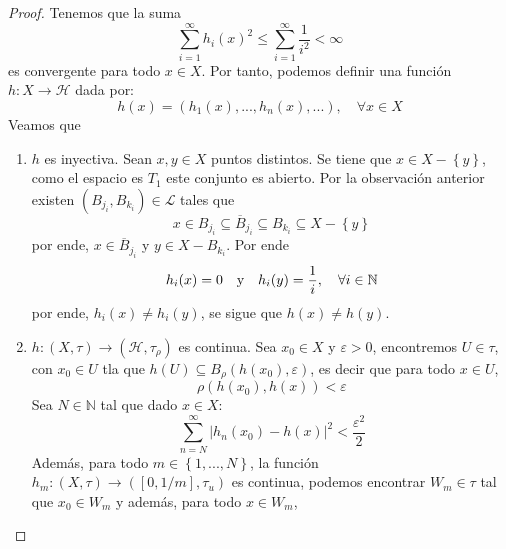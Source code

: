 \documentclass[12pt]{report}
\theoremstyle{largebreak}
\newcommand\abs[1]{\ensuremath{\left|#1\right|}}
\newcommand\cf[3]{\ensuremath{#1:#2\rightarrow#3}}
\begin{document}
    \begin{proof}
        Tenemos que la suma
        \begin{equation*}
            \sum_{ i=1}^\infty h_i(x)^2\leq\sum_{ i=1}^\infty\frac{1}{i^2} <\infty
        \end{equation*}
        es convergente para todo $x\in X$. Por tanto, podemos definir una función $\cf{h}{X}{\mathcal{H}}$ dada por:
        \begin{equation*}
            h(x)=(h_1(x),...,h_n(x),...),\quad\forall x\in X
        \end{equation*}
        Veamos que
        \begin{enumerate}
            \item $h$ es inyectiva. Sean $x,y\in X$ puntos distintos. Se tiene que $x\in X-\left\{y\right\}$, como el espacio es $T_1$ este conjunto es abierto. Por la observación anterior existen $(B_{ j_i},B_{ k_i})\in\mathcal{L}$ tales que
            \begin{equation*}
                x\in B_{ j_i}\subseteq\overline{B}_{ j_i}\subseteq B_{ k_i}\subseteq X-\left\{y\right\}
            \end{equation*}
            por ende, $x\in\overline{B}_{ j_i}$ y $y\in X-B_{ k_i}$. Por ende
            \begin{equation*}
                h_i(x)=0\quad\textup{y}\quad h_i(y)=\frac{1}{i},\quad\forall i\in\mathbb{N}
            \end{equation*}
            por ende, $h_i(x)\neq h_i(y)$, se sigue que $h(x)\neq h(y)$.
            \item $\cf{h}{(X,\tau)}{(\mathcal{H},\tau_{\rho})}$ es continua. Sea $x_0\in X$ y $\varepsilon>0$, encontremos $U\in\tau$, con $x_0\in U$ tla que $h(U)\subseteq B_\rho(h(x_0),\varepsilon)$, es decir que para todo $x\in U$,
            \begin{equation*}
                \rho(h(x_0),h(x))<\varepsilon
            \end{equation*}
            Sea $N\in\mathbb{N}$ tal que dado $x\in X$:
            \begin{equation*}
                \sum_{ n=N}^\infty\abs{ h_n(x_0)-h(x)}^2<\frac{\varepsilon^2}{2}
            \end{equation*}
            Además, para todo $m\in\left\{1,...,N \right\}$, la función $\cf{h_m}{(X,\tau)}{([0,1/m],\tau_u)}$ es continua, podemos encontrar $W_m\in\tau$ tal que $x_0\in W_m$ y además, para todo $x\in W_m$,
            \begin{equation*}

\end{equation*}
\end{enumerate}
\end{proof}
\end{document}
